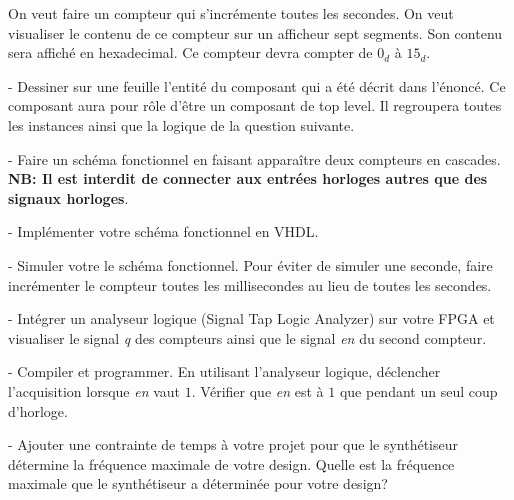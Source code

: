 On veut faire un compteur qui s’incrémente toutes les secondes. On veut visualiser le contenu de ce compteur sur un afficheur sept segments. Son contenu sera affiché en hexadecimal. Ce compteur devra compter de $0_d$ à $15_d$.

\medskip

- Dessiner sur une feuille l’entité du composant qui a été décrit dans l'énoncé. Ce composant aura pour rôle d'être un composant de top level. Il regroupera toutes les instances ainsi que la logique de la question suivante.

\medskip

- Faire un schéma fonctionnel en faisant apparaître deux compteurs en cascades. \\ 
\textbf{NB: Il est interdit de connecter aux entrées horloges autres que des signaux horloges}.

\medskip

- Implémenter votre schéma fonctionnel en VHDL.

\medskip

- Simuler votre le schéma fonctionnel. Pour éviter de simuler une seconde, faire incrémenter le compteur toutes les millisecondes au lieu de toutes les secondes.

\medskip

- Intégrer un analyseur logique (Signal Tap Logic Analyzer) sur votre FPGA et visualiser le signal \textit{q} des compteurs ainsi que le signal \textit{en} du second compteur.

\medskip

- Compiler et programmer. En utilisant l'analyseur logique, déclencher l'acquisition lorsque \textit{en} vaut $1$. Vérifier que \textit{en} est à $1$ que pendant un seul coup d'horloge.

\medskip

- Ajouter une contrainte de temps à votre projet pour que le synthétiseur détermine la fréquence maximale de votre design. Quelle est la fréquence maximale que le synthétiseur a déterminée pour votre design?